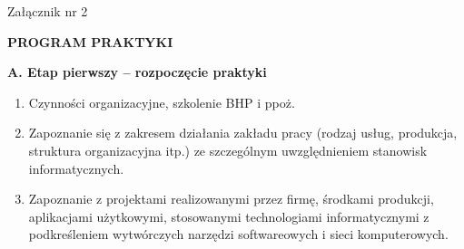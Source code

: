 \documentclass[12pt,a4paper]{article}
\begin{document}
\begin{flushright}
Załącznik nr 2
\end{flushright}

\begin{center}
\textbf{PROGRAM PRAKTYKI}
\end{center}
\vspace{1em}

\noindent \textbf{A. Etap pierwszy – rozpoczęcie praktyki}
\begin{enumerate}[label=\arabic*), leftmargin=*]
    \item Czynności organizacyjne, szkolenie BHP i ppoż.
    \item Zapoznanie się z zakresem działania zakładu pracy (rodzaj usług, produkcja, struktura organizacyjna itp.) ze szczególnym uwzględnieniem stanowisk informatycznych.
    \item Zapoznanie z projektami realizowanymi przez firmę, środkami produkcji, aplikacjami użytkowymi, stosowanymi technologiami informatycznymi z podkreśleniem wytwórczych narzędzi softwareowych i sieci komputerowych.
\end{enumerate}
\end{document}
